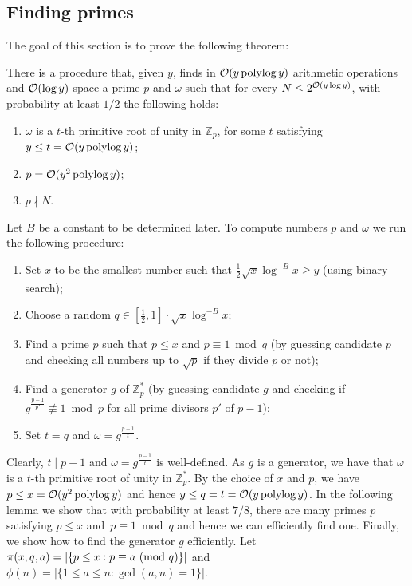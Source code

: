 \subsection{Finding primes}\label{se:finding_primes}

The goal of this section is to prove the following theorem:

\begin{thm}\label{thm:good_p_and_omega}
There is a procedure that, given $y$, finds in $\mathcal{O}(y\operatorname{polylog} y)$ arithmetic operations and $\mathcal{O}(\log y)$ space a prime $p$ and $\omega$ such that for every $N\leq 2^{\mathcal{O}(y\log y)}$, with probability at least $1/2$ the following holds:
\begin{enumerate}
\item $\omega$ is a $t$-th primitive root of unity in $\mathbb{Z}_{p}$, for some $t$ satisfying $y\leq  t = \mathcal{O}(y\operatorname{polylog} y)$;\label{root}
\item $p = \mathcal{O}( y^2\operatorname{polylog} y)$;\label{und}
\item $p \nmid N$.\label{notzero}
\end{enumerate}
\end{thm}
 
\noindent
Let $B$ be a constant to be determined later.
To compute numbers $p$ and $\omega$ we run the following procedure:
\begin{enumerate}
 \item Set $x$ to be the smallest number such that $\frac 12 \sqrt x \log^{-B}x \geq y$ (using binary search);
 \item Choose a random $q\in [\frac12,1]\cdot \sqrt{x}\log^{-B} x$;
 \item Find a prime $p$ such that $p \leq x$ and  $p \equiv 1 \bmod q$ (by guessing candidate $p$ and checking all numbers up to $\sqrt{p}$ if they divide $p$ or not); \item Find a generator $g$ of $\mathbb{Z}^{*}_{p}$ (by guessing candidate $g$ and checking if $g^{\frac{p-1}{p'}} \not\equiv 1 \bmod p$ for all prime divisors $p'$ of $p-1$);
 \item Set $t=q$  and $\omega=g^{\frac{p-1}{t}}$.
\end{enumerate}

Clearly, $t \mid p-1$ and $\omega=g^{\frac{p-1}{t}}$ is well-defined. As $g$ is a  generator, we have that $\omega$ is a $t$-th primitive root of unity in $\mathbb{Z}^{*}_{p}$.
By the choice of $x$ and $p$, we have $p \leq x = \mathcal{O}(y^2\operatorname{polylog} y)$ and hence $y\leq  q = t = \mathcal{O}(y\operatorname{polylog} y)$.
In the following lemma we show that with probability at least $7/8$, there are many primes $p$ satisfying $p \leq x$ and~$p \equiv 1 \bmod q$ and hence we can efficiently find one.
Finally, we show how to find the generator $g$ efficiently.
Let $\pi(x;q,a) = |\{p\leq x : p \equiv a \ (\mathrm{mod}\ q)\}|$ and $\phi(n)=|\{1\leq a \leq n: \gcd(a,n)=1\}|$.

